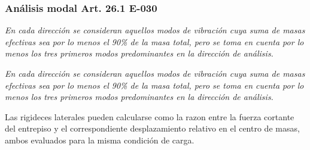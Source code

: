 \documentclass{article}%
\begin{document}
\subsubsection{Análisis modal Art. 26.1 E{-}030}%
\label{ssubsec:AnlisismodalArt.26.1E{-}030}%
\begin{tcolorbox}[colback=gray!5!white,colframe=Maroon!75!black,fonttitle=\bfseries,title=Art. 26.1.1]%
\textit{En cada dirección se consideran aquellos modos de vibración cuya suma de masas efectivas sea por lo menos el 90\% de la masa total, pero se toma en cuenta por lo menos los tres primeros modos predominantes en la dirección de análisis.}%
\end{tcolorbox}%
\begin{tcolorbox}[colback=gray!5!white,colframe=Maroon!75!black,fonttitle=\bfseries,title=Art. 26.1.2]%
\textit{En cada dirección se consideran aquellos modos de vibración cuya suma de masas efectivas sea por lo menos el 90\% de la masa total, pero se toma en cuenta por lo menos los tres primeros modos predominantes en la dirección de análisis.}%
\end{tcolorbox}%
Las rigideces laterales pueden calcularse como la razon entre la fuerza cortante del entrepiso y el correspondiente desplazamiento relativo en el centro de masas, ambos evaluados para la misma condición de carga. \newline%
%
\end{document}
